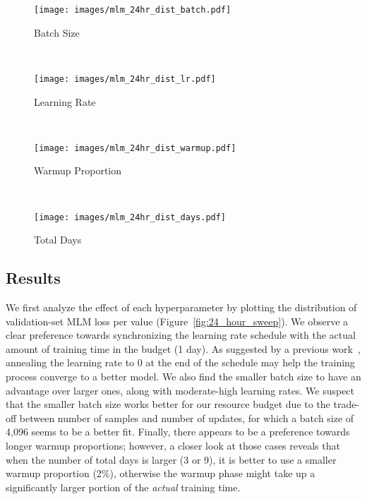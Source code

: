 \documentclass[11pt]{article}
\begin{document}
\begin{figure*}[ht!]
    \centering
    \begin{subfigure}[b]{0.23\textwidth}
        \texttt{[image: images/mlm\_24hr\_dist\_batch.pdf]}
        \caption{Batch Size}
        \label{fig:bs_dist}
    \end{subfigure}
    ~ \begin{subfigure}[b]{0.23\textwidth}
        \texttt{[image: images/mlm\_24hr\_dist\_lr.pdf]}
        \caption{Learning Rate}
        \label{fig:lr_dist}
    \end{subfigure}
    ~ \begin{subfigure}[b]{0.23\textwidth}
        \texttt{[image: images/mlm\_24hr\_dist\_warmup.pdf]}
        \caption{Warmup Proportion}
        \label{fig:warmup_proportion_dist}
    \end{subfigure}
    ~ \begin{subfigure}[b]{0.23\textwidth}
        \texttt{[image: images/mlm\_24hr\_dist\_days.pdf]}
        \caption{Total Days}
        \label{fig:total_day_dist}
    \end{subfigure}
    
    \caption{Distribution of the validation-set MLM loss after 24 hours of training, when varying across different hyperparameters.}
    \label{fig:24_hour_sweep}
\end{figure*}


\subsection{Results}

We first analyze the effect of each hyperparameter by plotting the distribution of validation-set MLM loss per value (Figure~\ref{fig:24_hour_sweep}).
We observe a clear preference towards synchronizing the learning rate schedule with the actual amount of training time in the budget (1 day).
As suggested by a previous work~\cite{Li2020BudgetedTR}, annealing the learning rate to 0 at the end of the schedule may help the training process converge to a better model.
We also find the smaller batch size to have an advantage over larger ones, along with moderate-high learning rates.
We suspect that the smaller batch size works better for our resource budget due to the trade-off between number of samples and number of updates, for which a batch size of 4,096 seems to be a better fit.
Finally, there appears to be a preference towards longer warmup proportions; however, a closer look at those cases reveals that when the number of total days is larger (3 or 9), it is better to use a smaller warmup proportion (2\%), otherwise the warmup phase might take up a significantly larger portion of the \textit{actual} training time.
\end{document}
